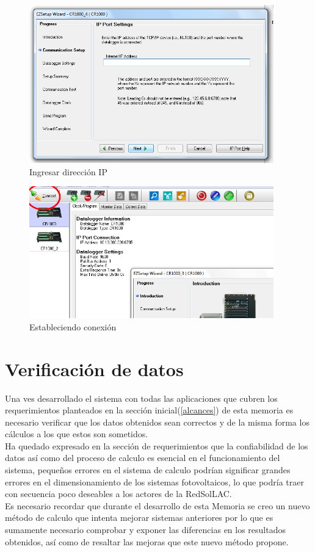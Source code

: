 \begin{figure}[h!]
        \centering
        \includegraphics[width=300pt]{images/pruebas2}
        \caption{Ingresar dirección IP}
        \label{pruebas2}
\end{figure}
\begin{figure}[h!]
        \centering
        \includegraphics[width=300pt]{images/pruebas3}
        \caption{Estableciendo conexión}
        \label{pruebas3}
\end{figure}

\section{Verificación de datos}
Una ves desarrollado el sistema con todas las aplicaciones que cubren los requerimientos planteados en la sección inicial(\ref{alcances}) de esta memoria es necesario verificar que los datos obtenidos sean correctos y de la misma forma los cálculos a los que estos son sometidos.\\
Ha quedado expresado en la sección de requerimientos que la confiabilidad de los datos así como del proceso de calculo es esencial en el funcionamiento del sistema, pequeños errores en el sistema de calculo podrían significar grandes errores en el dimensionamiento de los sistemas fotovoltaicos, lo que podría traer con secuencia poco deseables a los actores de la RedSolLAC.\\
Es necesario recordar que durante el desarrollo de esta Memoria se creo un nuevo método de calculo que intenta mejorar sistemas anteriores por lo que es sumamente necesario comprobar y exponer las diferencias en los resultados obtenidos, así como de resaltar las mejoras que este nuevo método propone.\\

